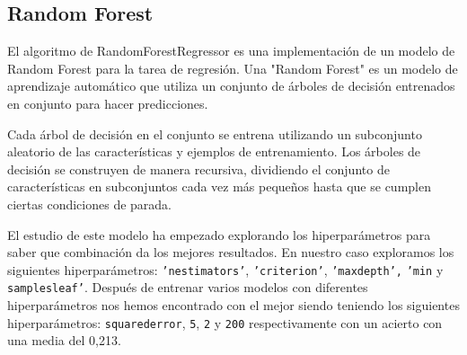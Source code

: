 \subsection{Random Forest}
El algoritmo de RandomForestRegressor es una implementación de un modelo de Random Forest para la tarea de regresión. Una "Random Forest" es un modelo de aprendizaje automático que utiliza un conjunto de árboles de decisión entrenados en conjunto para hacer predicciones.
\newline

Cada árbol de decisión en el conjunto se entrena utilizando un subconjunto aleatorio de las características y ejemplos de entrenamiento. Los árboles de decisión se construyen de manera recursiva, dividiendo el conjunto de características en subconjuntos cada vez más pequeños hasta que se cumplen ciertas condiciones de parada.
\newline

El estudio de este modelo ha empezado explorando los hiperparámetros para saber que combinación da los mejores resultados. En nuestro caso exploramos los siguientes hiperparámetros: \texttt{'n\textunderscore estimators'}, \texttt{'criterion'}, \texttt{'max\textunderscore depth',} \texttt{'min\textunderscore} y \texttt{samples\textunderscore leaf'}. Después de entrenar varios modelos con diferentes hiperparámetros nos hemos encontrado con el mejor siendo teniendo los siguientes hiperparámetros: \texttt{squared\textunderscore error}, \texttt{5}, \texttt{2} y \texttt{200} respectivamente con un acierto con una media del 0,213.